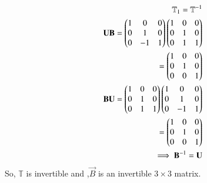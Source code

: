      \begin{align}
     \mathbb{T}_1=\mathbb{T}^{-1}\\
     \mathbf{U}\mathbf{B}=\begin{pmatrix}1&0&0\\0&1&0\\0&-1&1\end{pmatrix}\begin{pmatrix}1&0&0\\0&1&0\\0&1&1\end{pmatrix}\\
     =\begin{pmatrix}1&0&0\\0&1&0\\0&0&1\end{pmatrix}\\
     \mathbf{B}\mathbf{U}=\begin{pmatrix}1&0&0\\0&1&0\\0&1&1\end{pmatrix}\begin{pmatrix}1&0&0\\0&1&0\\0&-1&1\end{pmatrix}\\=\begin{pmatrix}1&0&0\\0&1&0\\0&0&1\end{pmatrix}\\
     \implies \mathbf{B}^{-1}=\mathbf{U}
\end{align}
So, $\mathbb{T}$ is invertible and ,$\vec{B}$ is an invertible $3 \times 3$ matrix.

